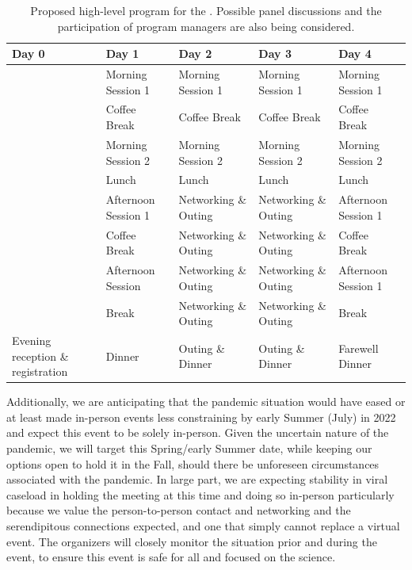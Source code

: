 \begin{table}[!t]
  \centering
  \begin{tabular}{|p{2.5cm}|p{2.5cm}|p{2.5cm}|p{2.5cm}|p{2.5cm}|}
    \hline 
    \rowcolor{Gray}
    \bfseries Day 0& \bfseries Day 1&\bfseries Day 2 &\bfseries Day 3 &\bfseries Day 4\\
    \hline
                   &Morning Session 1&Morning Session 1&Morning Session 1&Morning Session 1\\
    \hline
                   &Coffee Break&Coffee Break&Coffee Break&Coffee Break\\
    \hline    
                   &Morning Session 2&Morning Session 2&Morning Session 2&Morning Session 2\\
    \hline
                   &Lunch&Lunch&Lunch&Lunch\\
    \hline
                   &Afternoon Session 1&Networking \& Outing&Networking \& Outing&Afternoon Session 1\\
    \hline
                   &Coffee Break&Networking \& Outing&Networking \& Outing&Coffee Break\\
    \hline
                   &Afternoon Session &Networking \& Outing&Networking \& Outing&Afternoon Session 1\\
    \hline
                   &Break&Networking \& Outing&Networking \& Outing&Break\\
    \hline
    Evening reception \& registration&Dinner&Outing \& Dinner&Outing \&
                                                               Dinner&Farewell Dinner\\
    \hline        
  \end{tabular}
  \caption{Proposed high-level program for the \sympe. Possible panel
    discussions and the participation of program managers are also
    being considered.}
  \label{tab:symp}
\end{table}

Additionally, we are anticipating that the pandemic situation would
have eased or at least made in-person events less constraining by
early Summer (July) in 2022 and expect this event to be solely
in-person. Given the uncertain nature of the pandemic, we will target
this Spring/early Summer date, while keeping our options open to hold
it in the Fall, should there be unforeseen circumstances associated
with the pandemic. In large part, we are expecting stability in viral
caseload in holding the meeting at this time and doing so in-person
particularly because we value the person-to-person contact and
networking and the serendipitous connections expected, and one that
simply cannot replace a virtual event. The organizers will closely
monitor the situation prior and during the event, to ensure this event
is safe for all and focused on the science.


